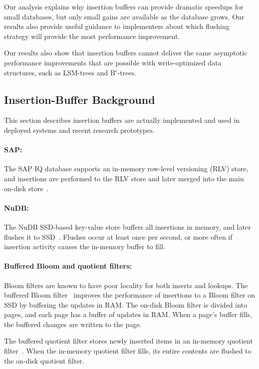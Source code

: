 Our analysis explains why insertion buffers can provide dramatic speedups for
small databases, but only small gains are available as the database grows.  Our
results also provide useful guidance to implementers about which flushing
strategy will provide the most performance improvement.

Our results also show that insertion buffers cannot deliver the same asymptotic
performance improvements that are possible with write-optimized data
structures, such as LSM-trees and B$^\epsilon$-trees.

\subsection{Insertion-Buffer Background}\label{sec:br-exp-deployed}

This section describes insertion buffers are actually implemented and used in
deployed systems and recent research prototypes.

\paragraph{SAP:} The SAP IQ database supports an in-memory row-level versioning
(RLV) store, and insertions are performed to the RLV store and later merged
into the main on-disk store~\cite{SAP17}.  

\paragraph{NuDB:}  The NuDB SSD-based key-value store buffers all insertions in
memory, and later flushes it to SSD~\cite{NuDB16}.  Flushes occur at least once
per second, or more often if insertion activity causes the in-memory buffer to
fill.

\paragraph{Buffered Bloom and quotient filters:}  Bloom filters are known to
have poor locality for both inserts and lookups.  The buffered Bloom
filter~\cite{CanimLaMi10} improves the performance of insertions to a Bloom
filter on SSD by buffering the updates in RAM.  The on-disk Bloom filter is
divided into pages, and each page has a buffer of updates in RAM.  When a
page's buffer fills, the buffered changes are written to the page.  

The buffered quotient filter stores newly inserted items in an in-memory
quotient filter~\cite{BenderFaJo12,benderadaptivebloom}.  When the in-memory
quotient filter fills, its entire contents are flushed to the on-disk quotient
filter.

